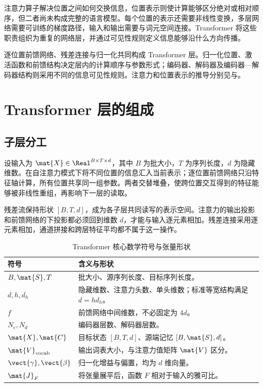 \documentclass[../textbook.tex]{subfiles}
\begin{document}
\fi
{}

注意力算子解决位置之间如何交换信息，位置表示则使计算能够区分绝对或相对顺序，但二者尚未构成完整的语言模型。每个位置的表示还需要非线性变换，多层网络需要可训练的梯度路径，输入和输出需要与词元空间连接。Transformer 将这些职责组织为重复的网络层，并通过可见性规则定义信息能够沿什么方向传播。

逐位置前馈网络、残差连接与归一化共同构成 Transformer 层。归一化位置、激活函数和前馈结构决定层内的计算顺序与参数形式；编码器、解码器及编码器—解码器结构则采用不同的信息可见性规则。注意力和位置表示的推导分别见与。

\section{Transformer 层的组成}

\subsection{子层分工}
设输入为 $\mat{X}\in\Real^{B\times T\times d}$，其中 $B$ 为批大小，$T$ 为序列长度，$d$ 为隐藏维数。在自注意力模式下将不同位置的信息汇入当前表示；逐位置前馈网络只沿特征轴计算，所有位置共享同一组参数。两者交替堆叠，使跨位置交互得到的特征能够被非线性重组，再影响下一层的读取。

残差流保持形状 $[B,T,d]$，成为各子层共同读写的表示空间。注意力的输出投影和前馈网络的下投影都必须回到维数 $d$，才能与输入逐元素相加。残差连接采用逐元素相加，通道拼接和跨层特征平均都不属于这一操作。

\begin{table}[htbp]
\centering
\caption{Transformer 核心数学符号与张量形状}\label{tab:transformer-notations}
\begin{tabularx}{\linewidth}{p{24mm}X}
\toprule 符号 & 含义与形状\\\midrule
$B,\mat{S},T$ & 批大小、源序列长度、目标序列长度。\\
$d,h,d_h$ & 隐藏维数、注意力头数、单头维数；标准等宽结构满足 $d=hd_h$。\\
$f$ & 前馈网络中间维数，不必固定为 $4d$。\\
$N_e,N_d$ & 编码器层数、解码器层数。\\
$\mat{X},\mat{C}$ & 目标状态 $[B,T,d]$、源端记忆 $[B,\mat{S},d]$。\\
$\mat{V}_{\mathrm{vocab}}$ & 输出词表大小，与注意力值矩阵 $\mat{V}$ 区分。\\
$\vect{\gamma},\vect{\beta}$ & 归一化增益与偏置，均为 $d$ 维向量。\\
$\mat{J}_F$ & 将张量展平后，函数 $F$ 相对于输入的雅可比。\\
\bottomrule
\end{tabularx}
\end{table}
\end{document}
